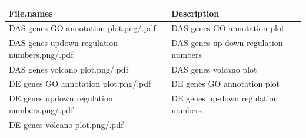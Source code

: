 \documentclass[]{article}
\begin{document}
\begin{longtable}[]{@{}ll@{}}
\toprule
\begin{minipage}[b]{0.51\columnwidth}\raggedright\strut
File.names\strut
\end{minipage} & \begin{minipage}[b]{0.43\columnwidth}\raggedright\strut
Description\strut
\end{minipage}\tabularnewline
\midrule
\endhead
\begin{minipage}[t]{0.51\columnwidth}\raggedright\strut
DAS genes GO annotation plot.png/.pdf\strut
\end{minipage} & \begin{minipage}[t]{0.43\columnwidth}\raggedright\strut
DAS genes GO annotation plot\strut
\end{minipage}\tabularnewline
\begin{minipage}[t]{0.51\columnwidth}\raggedright\strut
DAS genes updown regulation numbers.png/.pdf\strut
\end{minipage} & \begin{minipage}[t]{0.43\columnwidth}\raggedright\strut
DAS genes up-down regulation numbers\strut
\end{minipage}\tabularnewline
\begin{minipage}[t]{0.51\columnwidth}\raggedright\strut
DAS genes volcano plot.png/.pdf\strut
\end{minipage} & \begin{minipage}[t]{0.43\columnwidth}\raggedright\strut
DAS genes volcano plot\strut
\end{minipage}\tabularnewline
\begin{minipage}[t]{0.51\columnwidth}\raggedright\strut
DE genes GO annotation plot.png/.pdf\strut
\end{minipage} & \begin{minipage}[t]{0.43\columnwidth}\raggedright\strut
DE genes GO annotation plot\strut
\end{minipage}\tabularnewline
\begin{minipage}[t]{0.51\columnwidth}\raggedright\strut
DE genes updown regulation numbers.png/.pdf\strut
\end{minipage} & \begin{minipage}[t]{0.43\columnwidth}\raggedright\strut
DE genes up-down regulation numbers\strut
\end{minipage}\tabularnewline
\begin{minipage}[t]{0.51\columnwidth}\raggedright\strut
DE genes volcano plot.png/.pdf\strut
\end{minipage} & \begin{minipage}[t]{0.43\columnwidth}\raggedright\strut

\end{minipage}
\end{longtable}
\end{document}
